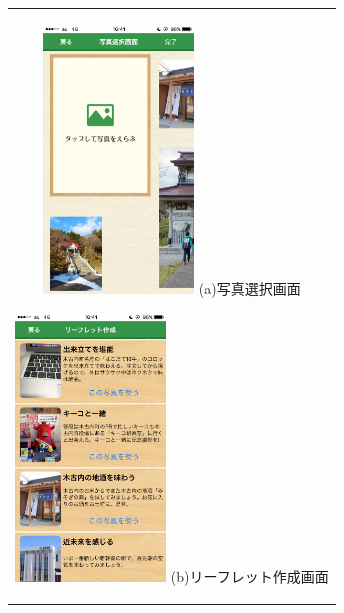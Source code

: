\begin{figure}[htbp]
  \begin{center}
    \begin{tabular}{c}

      \begin{minipage}{0.33\hsize}
        \begin{center}
\includegraphics[width=4cm, bb=0 0 304 570]{kiko_print2.PNG}
          \hspace{1cm} %
          {\footnotesize (a)写真選択画面}
        \end{center}
      \end{minipage}

      \begin{minipage}{0.33\hsize}
        \begin{center}
\includegraphics[width=4cm, bb=0 0 304 570]{kiko_print3.PNG}
          \hspace{1cm} %
          {\footnotesize (b)リーフレット作成画面}
        \end{center}
      \end{minipage}
      

\end{tabular}
\end{center}
\end{figure}
